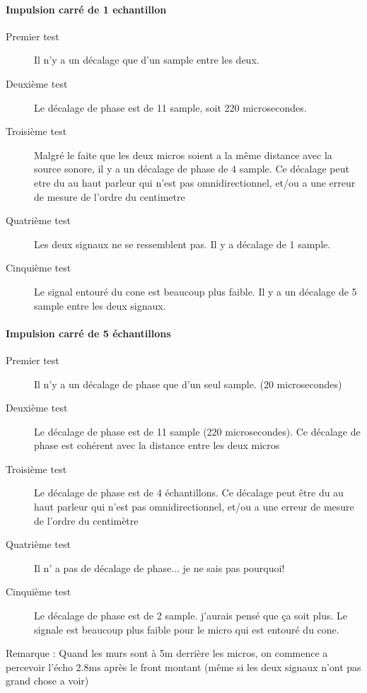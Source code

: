 \documentclass[12pt,a4paper]{report}
\begin{document}
\paragraph{Impulsion carré de 1 echantillon}
\begin{description}
\item[Premier test] Il n'y a un décalage que d'un sample entre les deux.
\item[Deuxième test] Le décalage de phase est de 11 sample, soit 220 microsecondes.
\item[Troisième test] Malgré le faite que les deux micros soient a la même distance avec la source sonore, il y a un décalage de phase de 4 sample. Ce décalage peut etre du au haut parleur qui n'est pas omnidirectionnel, et/ou a une erreur de mesure de l'ordre du centimetre
\item[Quatrième test] Les deux signaux ne se ressemblent pas. Il y a décalage de 1 sample.
\item[Cinquième test] Le signal entouré du cone est beaucoup plus faible. Il y a un décalage de 5 sample entre les deux signaux.
\end{description}

\paragraph{Impulsion carré de 5 échantillons}
\begin{description}
\item[Premier test] Il n'y a un décalage de phase que d'un seul sample. (20 microsecondes)
\item[Deuxième test] Le décalage de phase est de 11 sample (220 microsecondes). Ce décalage de phase est cohérent avec la distance entre les deux micros
\item[Troisième test] Le décalage de phase est de 4 échantillons.  Ce décalage peut être du au haut parleur qui n'est pas omnidirectionnel, et/ou a une erreur de mesure de l'ordre du centimètre
\item[Quatrième test] Il n' a pas de décalage de phase... je ne sais pas pourquoi!
\item[Cinquième test] Le décalage de phase est de 2 sample. j'aurais pensé que ça soit plus. Le signale est beaucoup plus faible pour le micro qui est entouré du cone. 
\end{description}
\begin{huge}
Remarque : Quand les murs sont à 5m derrière les micros, on commence a percevoir l'écho 2.8ms après le front montant (même si les deux signaux n'ont pas grand chose a voir)
\end{huge}
\end{document}
